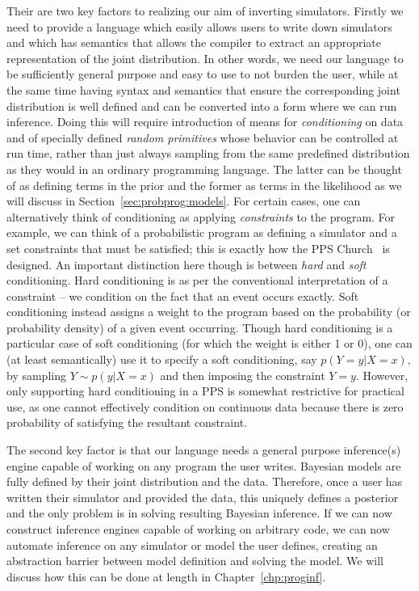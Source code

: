 Their are two key factors to realizing our aim of inverting simulators.  Firstly we need to provide a 
language which easily allows users to
write down simulators and which has semantics that allows the compiler to extract an appropriate
representation of the joint distribution.  In other words, we need our language to be sufficiently
general purpose and easy to use to not burden the user, while at the same time having syntax and semantics that
ensure the corresponding joint distribution is well defined and can be converted into a form where
we can run inference.  Doing this will require introduction of means for \emph{conditioning} on data
and of specially defined \emph{random primitives} whose behavior can be controlled at 
run time, rather than just always sampling from
the same predefined distribution as they would in an ordinary programming language.  
The latter can be thought of as defining terms in the prior and the
former as terms in the likelihood as we will discuss in Section~\ref{sec:probprog:models}.
For certain cases, one can alternatively think of conditioning as applying \emph{constraints} to the
program.  For example, we can think of a probabilistic program as defining a simulator
and a set constraints that must be satisfied; this is exactly
how the PPS Church~\citep{goodman2008church} is designed.  An important distinction 
here though is between \emph{hard} and \emph{soft} conditioning.  Hard conditioning is as per the conventional
interpretation of a constraint -- we condition on the fact that an event occurs exactly.  Soft conditioning instead
assigns a weight to the program based on the probability (or probability density) of a given event occurring.
Though hard conditioning is a particular case of soft conditioning (for which the weight is either 1 or 0),
one can (at least semantically) use it to specify a soft conditioning, say 
$p(Y=y | X=x)$, by sampling $Y\sim p(y|X=x)$ and then imposing the constraint $Y=y$.
However, only supporting hard conditioning in a PPS is somewhat restrictive for practical
use, as one cannot effectively condition on continuous data because there is zero probability of
satisfying the resultant constraint.

The second key factor is that our language needs a general purpose inference(s)
engine capable of working on any program the user writes.  Bayesian models are fully defined
by their joint distribution and the data.  Therefore, once a user has written their simulator and provided
the data, this uniquely defines a posterior and the only problem is in solving resulting Bayesian inference.
If we can now construct inference engines capable of working on arbitrary code, we can now 
automate inference on any simulator or model the user defines, creating an
abstraction barrier between model definition and solving the model.  We will discuss how this can be
done at length in Chapter~\ref{chp:proginf}.

